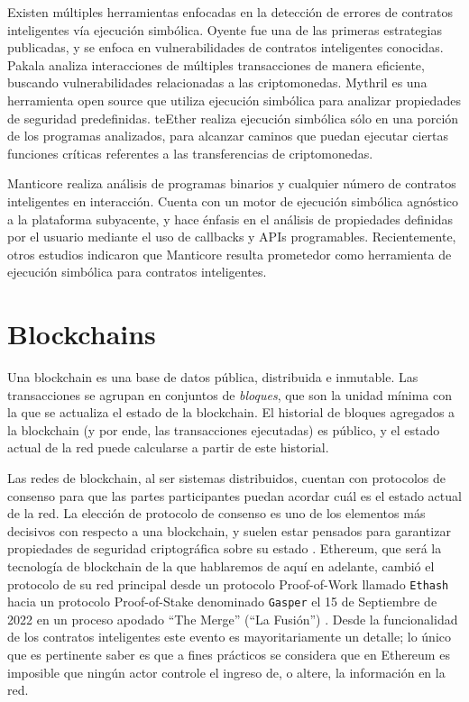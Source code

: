 Existen múltiples herramientas enfocadas en la detección de errores de contratos inteligentes vía ejecución simbólica.
Oyente \cite{oyente}\cite{vera-tesis} fue una de las primeras estrategias publicadas, y se enfoca en vulnerabilidades de contratos inteligentes conocidas.
Pakala \cite{pakala}\cite{vera-tesis} analiza interacciones de múltiples transacciones de manera eficiente, buscando vulnerabilidades relacionadas a las criptomonedas.
Mythril \cite{mythril}\cite{vera-tesis} es una herramienta open source que utiliza ejecución simbólica para analizar propiedades de seguridad predefinidas.
teEther \cite{teether}\cite{vera-tesis} realiza ejecución simbólica sólo en una porción de los programas analizados, para alcanzar caminos que puedan ejecutar ciertas funciones críticas referentes a las transferencias de criptomonedas.

Manticore \cite{manticore} realiza análisis de programas binarios y cualquier número de contratos inteligentes en interacción.
Cuenta con un motor de ejecución simbólica agnóstico a la plataforma subyacente, y hace énfasis en el análisis de propiedades definidas por el usuario mediante el uso de callbacks y APIs programables.
Recientemente, otros estudios \cite{vera-tesis} indicaron que Manticore resulta prometedor como herramienta de ejecución simbólica para contratos inteligentes.

\section{Blockchains}
Una blockchain es una base de datos pública, distribuida e inmutable.
Las transacciones se agrupan en conjuntos de \textit{bloques}, que son la unidad mínima con la que se actualiza el estado de la blockchain.
El historial de bloques agregados a la blockchain (y por ende, las transacciones ejecutadas) es público, y el estado actual de la red puede calcularse a partir de este historial.

Las redes de blockchain, al ser sistemas distribuidos, cuentan con protocolos de consenso para que las partes participantes puedan acordar cuál es el estado actual de la red.
La elección de protocolo de consenso es uno de los elementos más decisivos con respecto a una blockchain, y suelen estar pensados para garantizar propiedades de seguridad criptográfica sobre su estado \cite{bitcoin-backbone-protocol}\cite{ouroboros-protocol}\cite{survey-on-protocols}.
Ethereum, que será la tecnología de blockchain de la que hablaremos de aquí en adelante, cambió el protocolo de su red principal desde un protocolo Proof-of-Work llamado \texttt{Ethash} hacia un protocolo Proof-of-Stake denominado \texttt{Gasper} el 15 de Septiembre de 2022 en un proceso apodado ``The Merge'' (``La Fusión'') \cite{survey-of-blockchain-security} \cite{ethereum-yellow-paper} \cite{gasper-protocol} \cite{the-ethereum-merge}.
Desde la funcionalidad de los contratos inteligentes este evento es mayoritariamente un detalle; lo único que es pertinente saber es que a fines prácticos se considera que en Ethereum es imposible que ningún actor controle el ingreso de, o altere, la información en la red.

